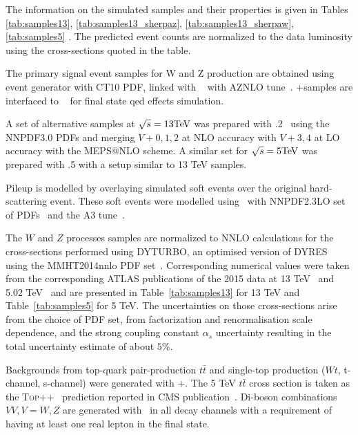     The information on the simulated samples and their properties is given in Tables \ref{tab:samples13}, \ref{tab:samples13_sherpaz}, \ref{tab:samples13_sherpaw},  \ref{tab:samples5} \cite{Kretzschmar:2657141}. The predicted event counts are normalized to the data luminosity using the cross-sections quoted in the table.
    
    The primary signal event samples for W and Z production are obtained using \Powheg~\cite{Nason:2004rx,Frixione:2007vw,Alioli:2008gx,Alioli:2010xd} event generator with CT10 PDF, linked with \Pythia~\cite{pythia} with AZNLO tune~\cite{STDM-2012-23}. \Powheg+\Pythia samples are interfaced to \Photos~\cite{Golonka:2005pn}  for final state \gls{qed} effects simulation.
    
    A set of alternative samples at $\sqrt{s} = 13\text{Te\kern -0.1em V}$ was prepared with .2~\cite{Hoche:2010kg} using the NNPDF3.0 PDFs and merging
    $V+0,1,2$ at NLO accuracy with $V+3,4$ at LO accuracy with the MEPS@NLO scheme. A similar set for $\sqrt{s} = 5\text{Te\kern -0.1em V}$ was prepared with .5 with a setup similar to 13 TeV samples.
    
    Pileup is modelled by overlaying simulated soft events over the original hard-scattering event. These soft events were modelled using \Pythia\ with NNPDF2.3LO set of PDFs~\cite{Ball:2012cx} and the A3 tune~\cite{ATL-PHYS-PUB-2016-017}.
    
    The $W$ and $Z$ processes samples are normalized to NNLO
    calculations for the cross-sections performed using DYTURBO, an optimised version
    of DYRES~\cite{Catani:2007vq,Catani:2009sm} using the MMHT2014nnlo PDF
    set~\cite{Harland-Lang:2014zoa}. Corresponding numerical values were taken from
    the corresponding ATLAS publications of the 2015 data at 13
    TeV~\cite{STDM-2015-03} and 5.02 TeV~\cite{HION-2018-02} and are presented in Table~\ref{tab:samples13} for 13 TeV and Table~\ref{tab:samples5} for 5 TeV. The
    uncertainties on those cross-sections arise from the choice of PDF set, from factorization
    and renormalisation scale dependence, and the strong
    coupling constant $\alpha_s$ uncertainty resulting in the total 
    uncertainty estimate of about $5\%$.
    
    Backgrounds from top-quark pair-production $t\bar{t}$ and 
    single-top production ($Wt$, t-channel, s-channel) were generated with
    \Powheg+\Pythia.
    The 5 TeV $t\bar{t}$ cross section is taken as the \textsc{Top++}~\cite{Czakon:2011xx} prediction reported in CMS publication~\cite{CMS-TOP-16-023}.
    Di-boson combinations $VV, V=W,Z$ are generated with \Sherpa\ in all decay channels with a requirement of having at least one real lepton in the final state.
    
